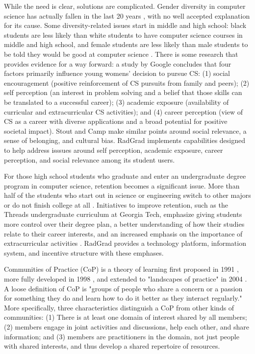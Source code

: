 \documentclass[acmsmall]{acmart}
\begin{document}
While the need is clear, solutions are complicated. Gender diversity in computer science has actually fallen in the last 20 years \cite{hong_women_2014}, with no well accepted explanation for its cause. Some diversity-related issues start in middle and high school: black students are less likely than white students to have computer science courses in middle and high school, and female students are less likely than male students to be told they would be good at computer science \cite{inc_diversity_2016}.   There is some research that provides evidence for a way forward: a study by Google \cite{hong_women_2014} concludes that four factors primarily influence young womens' decision to pursue CS: (1) social encouragement (positive reinforcement of CS pursuits from family and peers); (2) self perception (an interest in problem solving and a belief that those skills can be translated to a successful career); (3) academic exposure (availability of curricular and extracurricular CS activities); and (4) career perception (view of CS as a career with diverse applications and a broad potential for positive societal impact). Stout and Camp \cite{stout_now_2014} make similar points around social relevance, a sense of belonging, and cultural bias. RadGrad implements capabilities designed to help address isssues around self perception, academic exposure, career perception, and social relevance among its student users.

For those high school students who graduate and enter an undergraduate degree program in computer science, retention becomes a significant issue.   More than half of the students who start out in science or engineering switch to other majors or do not finish college at all \cite{kober_reaching_2015}. Initiatives to improve retention, such as the Threads undergraduate curriculum at Georgia Tech, emphasize giving students more control over their degree plan, a better understanding of how their studies relate to their career interests, and an increased emphasis on the importance of extracurricular activities \cite{barrett_expanding_2017}. RadGrad provides a technology platform, information system, and incentive structure with these emphases.

Communities of Practice (CoP) is a theory of learning first proposed in 1991 \cite{lave_situated_1991}, more fully developed in 1998 \cite{wenger_communities_1998}, and extended to "landscapes of practice" in 2004 \cite{wenger_learning_2004}. A loose definition of CoP is "groups of people who share a concern or a passion for something they do and learn how to do it better as they interact regularly." More specifically, three characteristics distinguish a CoP from other kinds of communities: (1) There is at least one domain of interest shared by all members; (2) members engage in joint activities and discussions, help each other, and share information;  and (3) members are practitioners in the domain, not just people with shared interests, and thus develop a shared repertoire of resources.
\end{document}
